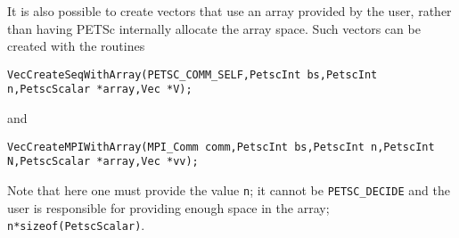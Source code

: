 It is also possible to create vectors that use an array provided by the user,
rather than having PETSc internally allocate the array space.
Such vectors can be created with the routines
\begin{lstlisting}
VecCreateSeqWithArray(PETSC_COMM_SELF,PetscInt bs,PetscInt n,PetscScalar *array,Vec *V);
\end{lstlisting}
and
\begin{lstlisting}
VecCreateMPIWithArray(MPI_Comm comm,PetscInt bs,PetscInt n,PetscInt N,PetscScalar *array,Vec *vv);
\end{lstlisting}
Note that here one must provide the value \lstinline{n}; it cannot be \lstinline{PETSC_DECIDE} and
the user is responsible for providing enough space in the array; \lstinline{n*sizeof(PetscScalar)}.

